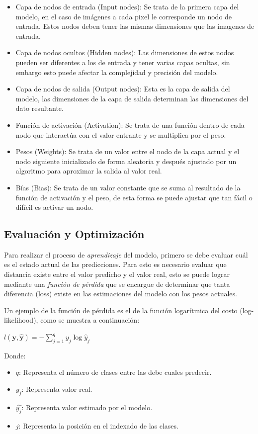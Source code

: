 \begin{itemize}
    \item Capa de nodos de entrada (Input nodes): Se trata de la primera capa del modelo, en el caso de imágenes a cada pixel le corresponde un nodo de entrada. Estos nodos deben tener las mismas dimensiones que las imagenes de entrada.
    \item Capa de nodos ocultos (Hidden nodes): Las dimensiones de estos nodos pueden ser diferentes a los de entrada y tener varias capas ocultas, sin embargo esto puede afectar la complejidad y precisión del modelo.
    \item Capa de nodos de salida (Output nodes): Esta es la capa de salida del modelo, las dimensiones de la capa de salida determinan las dimensiones del dato resultante.
    \item Función de activación (Activation): Se trata de una función dentro de cada nodo que interactúa con el valor entrante y se multiplica por el peso.
    \item Pesos (Weights): Se trata de un valor entre el nodo de la capa actual y el nodo siguiente inicializado de forma aleatoria y después ajustado por un algoritmo para aproximar la salida al valor real.
    \item Bías (Bias): Se trata de un valor constante que se suma al resultado de la función de activación y el peso, de esta forma se puede ajustar que tan fácil o difícil es activar un nodo.
\end{itemize}

\subsection{Evaluación y Optimización}
Para realizar el proceso de \emph{aprendizaje} del modelo, primero se debe evaluar cuál es el estado actual de las predicciones. Para esto es necesario evaluar que distancia existe entre el valor predicho y el valor real, esto se puede lograr mediante una \emph{función de pérdida} que se encargue de determinar que tanta diferencia (loss) existe en las estimaciones del modelo con los pesos actuales.

Un ejemplo de la función de pérdida es el de la función logarítmica del costo (log-likelihood), como se muestra a continuación:

$l(\mathbf{y}, \hat{\mathbf{y}}) = - \sum_{j=1}^q y_j \log \hat{y}_j$ 

Donde: 
\begin{itemize}
    \item $q$: Representa el número de clases entre las debe cuales predecir.
    \item $y_j$: Representa valor real.
    \item $\hat{y_j}$: Representa valor estimado por el modelo.
    \item $j$: Representa la posición en el indexado de las clases.
\end{itemize}

